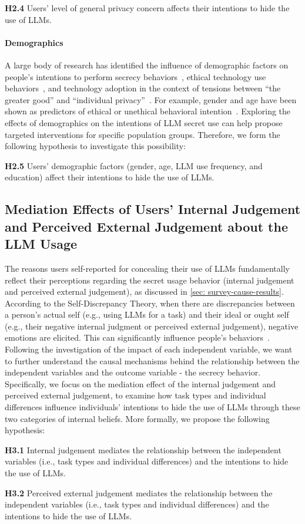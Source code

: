 \textbf{H2.4} Users' level of general privacy concern affects their intentions to hide the use of LLMs.

\paragraph{Demographics}
A large body of research has identified the influence of demographic factors on people's intentions to perform secrecy behaviors~\cite{slepian2022process}, ethical technology use behaviors~\cite{leonard2004influences}, and technology adoption in the context of tensions between ``the greater good'' and ``individual privacy''~\cite{li2021makes, nissenbaum2020privacy}.
For example, gender and age have been shown as predictors of ethical or unethical behavioral intention~\cite{dawson1997ethical}. 
Exploring the effects of demographics on the intentions of LLM secret use can help propose targeted interventions for specific population groups. 
Therefore, we form the following hypothesis to investigate this possibility:

\textbf{H2.5} Users' demographic factors (gender, age, LLM use frequency, and education) affect their intentions to hide the use of LLMs.

\subsection{Mediation Effects of Users' Internal Judgement and Perceived External Judgement about the LLM Usage}
The reasons users self-reported for concealing their use of LLMs fundamentally reflect their perceptions regarding the secret usage behavior (internal judgement and perceived external judgement), as discussed in \autoref{sec: survey-cause-results}.
According to the Self-Discrepancy Theory, when there are discrepancies between a person’s actual self (e.g., using LLMs for a task) and their ideal or ought self (e.g., their negative internal judgment or perceived external judgement), negative emotions are elicited.
This can significantly influence people’s behaviors~\cite{orellana2000decisional, mandel2017compensatory}.
Following the investigation of the impact of each independent variable, we want to further understand the causal mechanisms behind the relationship between the independent variables and the outcome variable - the secrecy behavior.
Specifically, we focus on the mediation effect of the internal judgement and perceived external judgement, to examine how task types and individual differences influence individuals' intentions to hide the use of LLMs through these two categories of internal beliefs. 
More formally, we propose the following hypothesis:

\textbf{H3.1} Internal judgement mediates the relationship between the independent variables (i.e., task types and individual differences) and the intentions to hide the use of LLMs.

\textbf{H3.2} Perceived external judgement mediates the relationship between the independent variables (i.e., task types and individual differences) and the intentions to hide the use of LLMs.

